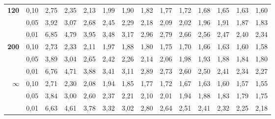 \documentclass[12pt,a4paper]{article}
\begin{document}
{\begin{longtable}{@{\extracolsep{\fill}}rrrrrrrrrrrrrr@{}}
\addlinespace[1pt]
\textbf{120} & 0,10 & 2,75 & 2,35 & 2,13 & 1,99 & 1,90 & 1,82 & 1,77 & 1,72 & 1,68 & 1,65 & 1,63 & 1,60 \\*
 & 0,05 & 3,92 & 3,07 & 2,68 & 2,45 & 2,29 & 2,18 & 2,09 & 2,02 & 1,96 & 1,91 & 1,87 & 1,83 \\*
 & 0,01 & 6,85 & 4,79 & 3,95 & 3,48 & 3,17 & 2,96 & 2,79 & 2,66 & 2,56 & 2,47 & 2,40 & 2,34 \\
\addlinespace[1pt]
\textbf{200} & 0,10 & 2,73 & 2,33 & 2,11 & 1,97 & 1,88 & 1,80 & 1,75 & 1,70 & 1,66 & 1,63 & 1,60 & 1,58 \\*
 & 0,05 & 3,89 & 3,04 & 2,65 & 2,42 & 2,26 & 2,14 & 2,06 & 1,98 & 1,93 & 1,88 & 1,84 & 1,80 \\*
 & 0,01 & 6,76 & 4,71 & 3,88 & 3,41 & 3,11 & 2,89 & 2,73 & 2,60 & 2,50 & 2,41 & 2,34 & 2,27 \\
\addlinespace[1pt]
\textbf{$\infty$} & 0,10 & 2,71 & 2,30 & 2,08 & 1,94 & 1,85 & 1,77 & 1,72 & 1,67 & 1,63 & 1,60 & 1,57 & 1,55 \\*
 & 0,05 & 3,84 & 3,00 & 2,60 & 2,37 & 2,21 & 2,10 & 2,01 & 1,94 & 1,88 & 1,83 & 1,79 & 1,75 \\*
 & 0,01 & 6,63 & 4,61 & 3,78 & 3,32 & 3,02 & 2,80 & 2,64 & 2,51 & 2,41 & 2,32 & 2,25 & 2,18 \\
\end{longtable}
}

\clearpage
{}\par\smallskip
\end{document}
